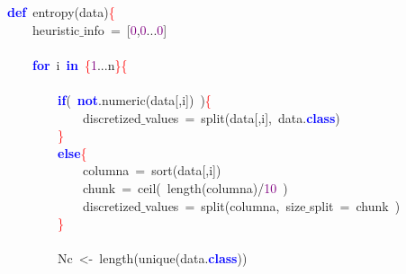 \noindent
\mbox{}\textbf{\textcolor{Blue}{def}}\ entropy\textcolor{BrickRed}{(}data\textcolor{BrickRed}{)}\textcolor{Red}{\{} \\
\mbox{}\ \ \ \ heuristic$\_$info\ \textcolor{BrickRed}{=}\ \textcolor{BrickRed}{[}\textcolor{Purple}{0}\textcolor{BrickRed}{,}\textcolor{Purple}{0}\textcolor{BrickRed}{...}\textcolor{Purple}{0}\textcolor{BrickRed}{]} \\
\mbox{} \\
\mbox{}\ \ \ \ \textbf{\textcolor{Blue}{for}}\ i\ \textbf{\textcolor{Blue}{in}}\ \textcolor{Red}{\{}\textcolor{Purple}{1}\textcolor{BrickRed}{...}n\textcolor{Red}{\}\{} \\
\mbox{} \\
\mbox{}\ \ \ \ \ \ \ \ \textbf{\textcolor{Blue}{if}}\textcolor{BrickRed}{(}\ \textbf{\textcolor{Blue}{not}}\textcolor{BrickRed}{.}numeric\textcolor{BrickRed}{(}data\textcolor{BrickRed}{[,}i\textcolor{BrickRed}{])}\ \textcolor{BrickRed}{)}\textcolor{Red}{\{} \\
\mbox{}\ \ \ \ \ \ \ \ \ \ \ \ discretized$\_$values\ \textcolor{BrickRed}{=}\ split\textcolor{BrickRed}{(}data\textcolor{BrickRed}{[,}i\textcolor{BrickRed}{],}\ data\textcolor{BrickRed}{.}\textbf{\textcolor{Blue}{class}}\textcolor{BrickRed}{)} \\
\mbox{}\ \ \ \ \ \ \ \ \textcolor{Red}{\}} \\
\mbox{}\ \ \ \ \ \ \ \ \textbf{\textcolor{Blue}{else}}\textcolor{Red}{\{} \\
\mbox{}\ \ \ \ \ \ \ \ \ \ \ \ columna\ \textcolor{BrickRed}{=}\ sort\textcolor{BrickRed}{(}data\textcolor{BrickRed}{[,}i\textcolor{BrickRed}{])} \\
\mbox{}\ \ \ \ \ \ \ \ \ \ \ \ chunk\ \textcolor{BrickRed}{=}\ ceil\textcolor{BrickRed}{(}\ length\textcolor{BrickRed}{(}columna\textcolor{BrickRed}{)/}\textcolor{Purple}{10}\ \textcolor{BrickRed}{)} \\
\mbox{}\ \ \ \ \ \ \ \ \ \ \ \ discretized$\_$values\ \textcolor{BrickRed}{=}\ split\textcolor{BrickRed}{(}columna\textcolor{BrickRed}{,}\ size$\_$split\ \textcolor{BrickRed}{=}\ chunk\ \textcolor{BrickRed}{)} \\
\mbox{}\ \ \ \ \ \ \ \ \textcolor{Red}{\}} \\
\mbox{} \\
\mbox{}\ \ \ \ \ \ \ \ Nc\ \textcolor{BrickRed}{\textless{}-}\ length\textcolor{BrickRed}{(}unique\textcolor{BrickRed}{(}data\textcolor{BrickRed}{.}\textbf{\textcolor{Blue}{class}}\textcolor{BrickRed}{))} \\
